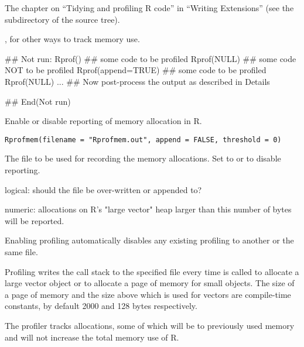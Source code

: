 %
\begin{SeeAlso}\relax
The chapter on ``Tidying and profiling R code'' in
``Writing \R{} Extensions'' (see the  subdirectory
of the \R{} source tree).


,  for other ways to track
memory use.
\end{SeeAlso}
%
\begin{Examples}
\begin{ExampleCode}
## Not run: Rprof()
## some code to be profiled
Rprof(NULL)
## some code NOT to be profiled
Rprof(append=TRUE)
## some code to be profiled
Rprof(NULL)
...
## Now post-process the output as described in Details

## End(Not run)
\end{ExampleCode}
\end{Examples}
%
\begin{Description}\relax
Enable or disable reporting of memory allocation in R.
\end{Description}
%
\begin{Usage}
\begin{verbatim}
Rprofmem(filename = "Rprofmem.out", append = FALSE, threshold = 0)
\end{verbatim}
\end{Usage}
%
\begin{Arguments}
\begin{ldescription}
\item[\code{filename}] The file to be used for recording the memory
allocations. Set to  or  to disable reporting. 
\item[\code{append}] logical: should the file be over-written or appended to? 
\item[\code{threshold}] numeric: allocations on R's "large vector" heap
larger than this number of bytes will be reported.

\end{ldescription}
\end{Arguments}
%
\begin{Details}\relax
Enabling profiling automatically disables any existing profiling to
another or the same file.

Profiling writes the call stack to the specified file every time
 is called to allocate a large vector object or to
allocate a page of memory for small objects. The size of a page of
memory and the size above which  is used for vectors are
compile-time constants, by default 2000 and 128 bytes respectively.

The profiler tracks allocations, some of which will be to previously
used memory and will not increase the total memory use of R.
\end{Details}

